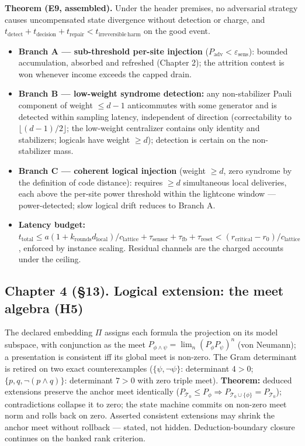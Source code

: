 \documentclass[
]{article}
\providecommand{\tightlist}{%
  \setlength{\itemsep}{0pt}\setlength{\parskip}{0pt}}
\begin{document}
\textbf{Theorem (E9, assembled).} Under the header premises, no
adversarial strategy causes uncompensated state divergence without
detection or charge, and
\(t_{\mathrm{detect}}+t_{\mathrm{decision}}+t_{\mathrm{repair}}<t_{\mathrm{irreversible\ harm}}\)
on the good event.

\begin{itemize}
\tightlist
\item
  \textbf{Branch A --- sub-threshold per-site injection}
  (\(P_{\mathrm{adv}}<\varepsilon_{\mathrm{sens}}\)): bounded
  accumulation, absorbed and refreshed (Chapter 2); the attrition
  contest is won whenever income exceeds the capped drain.
\item
  \textbf{Branch B --- low-weight syndrome detection:} any
  non-stabilizer Pauli component of weight \(\le d-1\) anticommutes with
  some generator and is detected within sampling latency, independent of
  direction (correctability to \(\lfloor(d-1)/2\rfloor\); the low-weight
  centralizer contains only identity and stabilizers; logicals have
  weight \(\ge d\)); detection is certain on the non-stabilizer mass.
\item
  \textbf{Branch C --- coherent logical injection} (weight \(\ge d\),
  zero syndrome by the definition of code distance): requires \(\ge d\)
  simultaneous local deliveries, each above the per-site power threshold
  within the lightcone window --- power-detected; slow logical drift
  reduces to Branch A.
\item
  \textbf{Latency budget:}
  \(t_{\mathrm{total}}\le a(1+k_{\mathrm{rounds}}d_{\mathrm{local}})/c_{\mathrm{lattice}}+\tau_{\mathrm{sensor}}+\tau_{\mathrm{fb}}+\tau_{\mathrm{reset}}<(r_{\mathrm{critical}}-r_0)/c_{\mathrm{lattice}}\),
  enforced by instance scaling. Residual channels are the charged
  accounts under the ceiling.
\end{itemize}

\subsection{Chapter 4 (§13). Logical extension: the meet algebra
(H5)}\label{chapter-4-13.-logical-extension-the-meet-algebra-h5}

The declared embedding \(\Pi\) assigns each formula the projection on
its model subspace, with conjunction as the meet
\(P_{\phi\wedge\psi}=\lim_n(P_\phi P_\psi)^n\) (von Neumann); a
presentation is consistent iff its global meet is non-zero. The Gram
determinant is retired on two exact counterexamples
(\(\{\psi,\neg\psi\}\): determinant \(4>0\);
\(\{p,q,\neg(p\wedge q)\}\): determinant \(7>0\) with zero triple meet).
\textbf{Theorem:} deduced extensions preserve the anchor meet
identically
(\(P_{\mathcal T_0}\le P_\phi\Rightarrow P_{\mathcal T_0\cup\{\phi\}}=P_{\mathcal T_0}\));
contradictions collapse it to zero; the state machine commits on
non-zero meet norm and rolls back on zero. Asserted consistent
extensions may shrink the anchor meet without rollback --- stated, not
hidden. Deduction-boundary closure continues on the banked rank
criterion.
\end{document}
